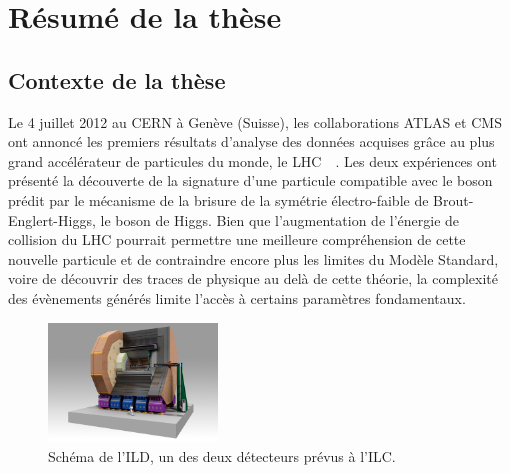 \chapter{Résumé de la thèse}
\setcounter{chapter}{1}
\setcounter{section}{0}


  \section{Contexte de la thèse}

  Le 4 juillet 2012 au CERN à Genève (Suisse), les collaborations ATLAS et CMS ont annoncé les premiers résultats d'analyse des données acquises grâce au plus grand accélérateur de particules du monde, le \acrfull{LHC}~\cite{Aad2012}~\cite{Chatrchyan2012}. 
  Les deux expériences ont présenté la découverte de la signature d'une particule compatible avec le boson prédit par le mécanisme de la brisure de la symétrie électro-faible de Brout-Englert-Higgs, le boson de Higgs.
  Bien que l'augmentation de l'énergie de collision du LHC pourrait permettre une meilleure compréhension de cette nouvelle particule et de contraindre encore plus les limites du Modèle Standard, voire de découvrir des traces de physique au delà de cette théorie, la complexité des évènements générés limite l'accès à certains paramètres fondamentaux.
  
  \begin{figure}[!h]
    \centering
    \includegraphics[width = 0.4\textwidth]{Pictures/ILC/ILD.jpg}
    \caption{Schéma de l'ILD, un des deux détecteurs prévus à l'ILC.}
    \label{fig:ILD_resume}
  \end{figure}
 
